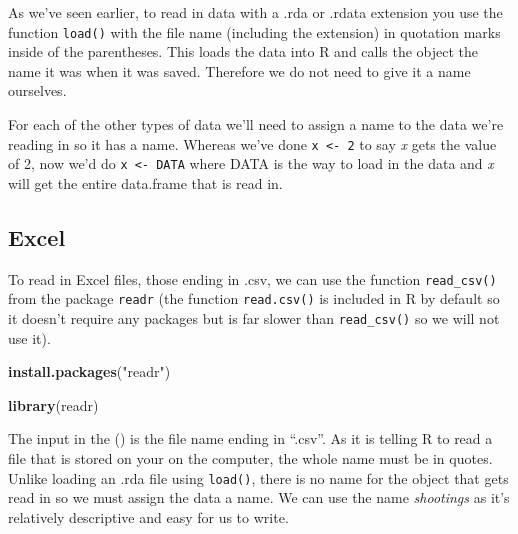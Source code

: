 \documentclass[
  12pt,
]{book}
\newenvironment{Shaded}{\begin{snugshade}}{\end{snugshade}}
\newcommand{\KeywordTok}[1]{\textcolor[rgb]{0.13,0.29,0.53}{\textbf{#1}}}
\newcommand{\NormalTok}[1]{#1}
\newcommand{\StringTok}[1]{\textcolor[rgb]{0.31,0.60,0.02}{#1}}
\begin{document}
As we've seen earlier, to read in data with a .rda or .rdata extension you use the function \texttt{load()} with the file name (including the extension) in quotation marks inside of the parentheses. This loads the data into R and calls the object the name it was when it was saved. Therefore we do not need to give it a name ourselves.

For each of the other types of data we'll need to assign a name to the data we're reading in so it has a name. Whereas we've done \texttt{x\ \textless{}-\ 2} to say \emph{x} gets the value of 2, now we'd do \texttt{x\ \textless{}-\ DATA} where DATA is the way to load in the data and \emph{x} will get the entire data.frame that is read in.

\hypertarget{excel}{%
\subsection{Excel}\label{excel}}

To read in Excel files, those ending in .csv, we can use the function \texttt{read\_csv()} from the package \texttt{readr} (the function \texttt{read.csv()} is included in R by default so it doesn't require any packages but is far slower than \texttt{read\_csv()} so we will not use it).

\begin{Shaded}
\begin{Highlighting}[]
\KeywordTok{install.packages}\NormalTok{(}\StringTok{"readr"}\NormalTok{)}
\end{Highlighting}
\end{Shaded}

\begin{Shaded}
\begin{Highlighting}[]
\KeywordTok{library}\NormalTok{(readr)}
\end{Highlighting}
\end{Shaded}

The input in the () is the file name ending in ``.csv''. As it is telling R to read a file that is stored on your on the computer, the whole name must be in quotes. Unlike loading an .rda file using \texttt{load()}, there is no name for the object that gets read in so we must assign the data a name. We can use the name \emph{shootings} as it's relatively descriptive and easy for us to write.
\end{document}
